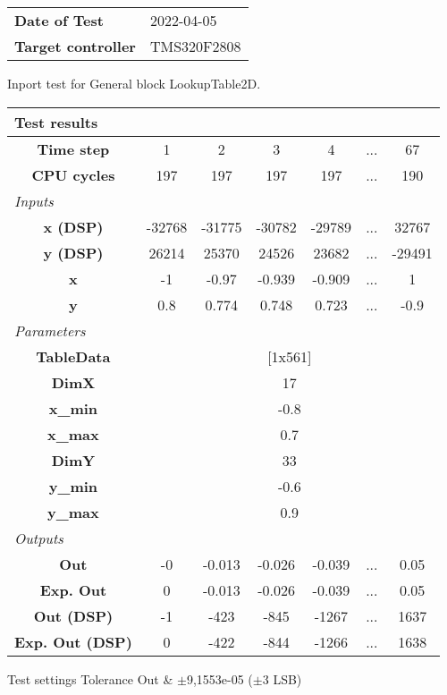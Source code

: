 \begin{tabular}{l l}
\textbf{Date of Test} & 2022-04-05 \tabularnewline
\textbf{Target controller} & TMS320F2808 \tabularnewline
\end{tabular}
\vspace{1ex}
Inport test for General block LookupTable2D.

\vspace{1em}
\begin{tabularx}{\textwidth}{|c|c|c|c|c|>{\centering\arraybackslash}X|c|}
\hline
\multicolumn{7}{|l|}{\cellcolor[gray]{0.8}\textbf{Test results}} \tabularnewline \hline
\textbf{Time step} & 1 & 2 & 3 & 4 & ... & 67 \tabularnewline \hline
\textbf{CPU cycles} & 197 & 197 & 197 & 197 & ... & 190 \tabularnewline \hline
\multicolumn{7}{|l|}{\cellcolor[gray]{0.9}\textit{Inputs}} \tabularnewline \hline
\textbf{x (DSP)} & -32768 & -31775 & -30782 & -29789 & ... & 32767 \tabularnewline \hline
\textbf{y (DSP)} & 26214 & 25370 & 24526 & 23682 & ... & -29491 \tabularnewline \hline
\textbf{x} & -1 & -0.97 & -0.939 & -0.909 & ... & 1 \tabularnewline \hline
\textbf{y} & 0.8 & 0.774 & 0.748 & 0.723 & ... & -0.9 \tabularnewline \hline
\multicolumn{7}{|l|}{\cellcolor[gray]{0.9}\textit{Parameters}} \tabularnewline \hline
\textbf{TableData} & \multicolumn{6}{c|}{[1x561]} \tabularnewline \hline
\textbf{DimX} & \multicolumn{6}{c|}{17} \tabularnewline \hline
\textbf{x\_min} & \multicolumn{6}{c|}{-0.8} \tabularnewline \hline
\textbf{x\_max} & \multicolumn{6}{c|}{0.7} \tabularnewline \hline
\textbf{DimY} & \multicolumn{6}{c|}{33} \tabularnewline \hline
\textbf{y\_min} & \multicolumn{6}{c|}{-0.6} \tabularnewline \hline
\textbf{y\_max} & \multicolumn{6}{c|}{0.9} \tabularnewline \hline
\multicolumn{7}{|l|}{\cellcolor[gray]{0.9}\textit{Outputs}} \tabularnewline \hline
\textbf{Out} & -0 & -0.013 & -0.026 & -0.039 & ... & 0.05 \tabularnewline \hline
\textbf{Exp. Out} & 0 & -0.013 & -0.026 & -0.039 & ... & 0.05 \tabularnewline \hline
\textbf{Out (DSP)} & -1 & -423 & -845 & -1267 & ... & 1637 \tabularnewline \hline
\textbf{Exp. Out (DSP)} & 0 & -422 & -844 & -1266 & ... & 1638 \tabularnewline \hline
\end{tabularx}
\vspace{1ex}

\begin{XtoCtabular}{Test settings}
Tolerance Out & $\pm$9,1553e-05 ($\pm$3 LSB) \tabularnewline \hline
\end{XtoCtabular}

